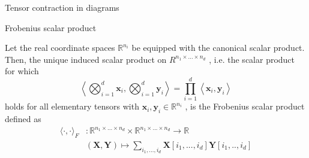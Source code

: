 \documentclass{beamer}
\newcommand{\bvec}[1]{\mathbf{#1}}
\newcommand{\vx}{\bvec{x}}
\newcommand{\vy}{\bvec{y}}
\newcommand{\vX}{\bvec{X}}
\newcommand{\vY}{\bvec{Y}}
\begin{document}
\begin{frame}{Tensor contraction in diagrams}
    
\end{frame}

\begin{frame}{Frobenius scalar product}

Let the real coordinate spaces $\mathbb{R}^{n_i}$ be equipped with the canonical scalar product. 
\pause
Then, the unique induced scalar product
on $R^{n_1\times ... \times n_d}$ , i.e. the scalar product for which
$$
\left\langle
\bigotimes_{i=1}^d \vx_i , \bigotimes_{i=1}^d \vy_i 
\right\rangle 
=
\prod_{i=1}^d 
\left\langle
 \vx_i , \vy_i 
\right\rangle 
$$
holds for all elementary tensors with $\vx_i, \vy_i \in \mathbb{R}^{n_i}$ , is the Frobenius scalar product defined as
\begin{equation*}
\begin{aligned}
\langle
\cdot, \cdot
\rangle_F
&:\mathbb{R}^{n_1 \times ... \times n_d} \times \mathbb{R}^{n_1 \times ... \times n_d}
\to \mathbb{R}\\
&(\vX, \vY)
\mapsto
\sum_{i_1,...,i_d} \vX[i_1,...,i_d] \vY[i_1,..,i_d]
\end{aligned}
\end{equation*}
    
\end{frame}
\end{document}
